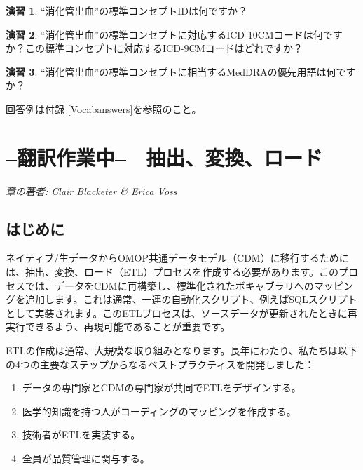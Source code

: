 \documentclass[
  11pt]{book}
\providecommand{\tightlist}{%
  \setlength{\itemsep}{0pt}\setlength{\parskip}{0pt}}
\theoremstyle{definition}
\theoremstyle{definition}
\theoremstyle{definition}
\newtheorem{exercise}{演習}[chapter]
\theoremstyle{definition}
\theoremstyle{remark}
\begin{document}
\begin{exercise}
\protect\hypertarget{exr:exerciseVocab1}{}\label{exr:exerciseVocab1}``消化管出血''の標準コンセプトIDは何ですか？
\end{exercise}

\begin{exercise}
\protect\hypertarget{exr:exerciseVocab2}{}\label{exr:exerciseVocab2}``消化管出血''の標準コンセプトに対応するICD-10CMコードは何ですか？この標準コンセプトに対応するICD-9CMコードはどれですか？
\end{exercise}

\begin{exercise}
\protect\hypertarget{exr:exerciseVocab3}{}\label{exr:exerciseVocab3}``消化管出血''の標準コンセプトに相当するMedDRAの優先用語は何ですか？
\end{exercise}

回答例は付録 \ref{Vocabanswers}を参照のこと。

\chapter{--翻訳作業中--　抽出、変換、ロード}\label{ExtractTransformLoad}

\emph{章の著者: Clair Blacketer \& Erica Voss}

\section{はじめに}\label{ux306fux3058ux3081ux306b}

ネイティブ/生データからOMOP共通データモデル（CDM）に移行するためには、抽出、変換、ロード（ETL）プロセスを作成する必要があります。このプロセスでは、データをCDMに再構築し、標準化されたボキャブラリへのマッピングを追加します。これは通常、一連の自動化スクリプト、例えばSQLスクリプトとして実装されます。このETLプロセスは、ソースデータが更新されたときに再実行できるよう、再現可能であることが重要です。   

ETLの作成は通常、大規模な取り組みとなります。長年にわたり、私たちは以下の4つの主要なステップからなるベストプラクティスを開発しました：

\begin{enumerate}
\def\labelenumi{\arabic{enumi}.}
\tightlist
\item
  データの専門家とCDMの専門家が共同でETLをデザインする。
\item
  医学的知識を持つ人がコーディングのマッピングを作成する。
\item
  技術者がETLを実装する。
\item
  全員が品質管理に関与する。
\end{enumerate}
\end{document}
